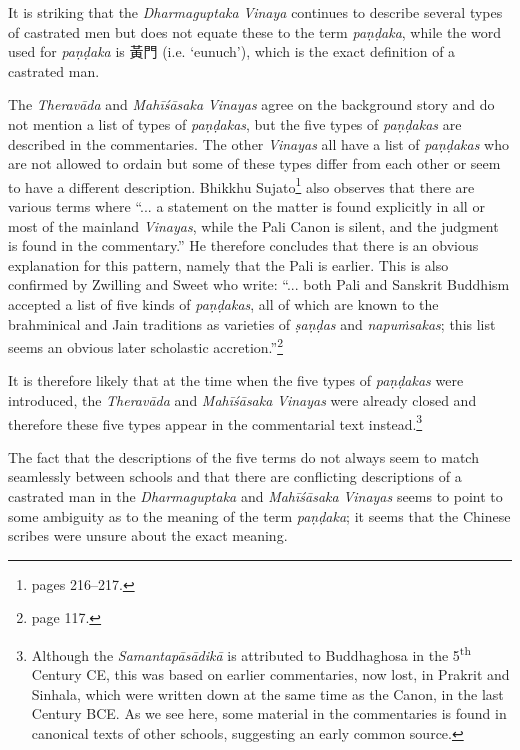 It is striking that the \textit{Dharmaguptaka} \textit{Vinaya} continues to describe several types of castrated men but does not equate these to the term \textit{paṇḍaka}, while the word used for \textit{paṇḍaka} is 黃門 (i.e. `eunuch'), which is the exact definition of a castrated man.

The \textit{Theravāda} and \textit{Mahīśāsaka} \textit{Vinayas} agree on the background story and do not mention a list of types of \textit{paṇḍakas}, but the five types of \textit{paṇḍakas} are described in the commentaries. The other \textit{Vinayas} all have a list of \textit{paṇḍakas} who are not allowed to ordain but some of these types differ from each other or seem to have a different description. Bhikkhu Sujato\footnote{\cite{sujato2009} pages 216–217.} also observes that there are various terms where ``... a statement on the matter is found explicitly in all or most of the mainland \textit{Vinayas}, while the Pali Canon is silent, and the judgment is found in the commentary.'' He therefore concludes that there is an obvious explanation for this pattern, namely that the Pali is earlier. This is also confirmed by Zwilling and Sweet who write: ``... both Pali and Sanskrit Buddhism accepted a list of five kinds of \textit{paṇḍakas}, all of which are known to the brahminical and Jain traditions as varieties of \textit{ṣaṇḍas} and \textit{napuṁsakas}; this list seems an obvious later scholastic accretion.''\footnote{\cite{zwilling2000} page 117.}

It is therefore likely that at the time when the five types of \textit{paṇḍakas} were introduced, the \textit{Theravāda} and \textit{Mahīśāsaka} \textit{Vinayas} were already closed and therefore these five types appear in the commentarial text instead.\footnote{Although the \textit{Samantapāsādikā} is attributed to Buddhaghosa in the 5\textsuperscript{th} Century CE, this was based on earlier commentaries, now lost, in Prakrit and Sinhala, which were written down at the same time as the Canon, in the last Century BCE. As we see here, some material in the commentaries is found in canonical texts of other schools, suggesting an early common source.} 

The fact that the descriptions of the five terms do not always seem to match seamlessly between schools and that there are conflicting descriptions of a castrated man in the \textit{Dharmaguptaka} and \textit{Mahīśāsaka} \textit{Vinayas} seems to point to some ambiguity as to the meaning of the term \textit{paṇḍaka}; it seems that the Chinese scribes were unsure about the exact meaning.

